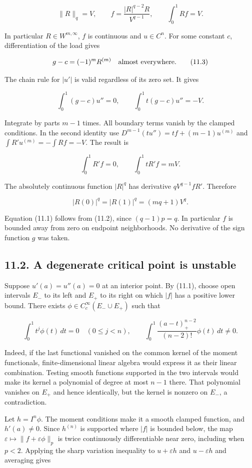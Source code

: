 \documentclass[11pt]{article}
\begin{document}
\[
\|R\|_q=V,\qquad f=\frac{|R|^{q-2}R}{V^{q-1}},\qquad
\int_0^1Rf=V.
\tag{11.2}
\]

In particular \(R\in W^{m,\infty}\), \(f\) is continuous and
\(u\in C^n\). For some constant \(c\), differentiation of the load gives

\[
g-c=(-1)^mR^{(m)}\quad\hbox{almost everywhere}.
\tag{11.3}
\]

The chain rule for \(|u'|\) is valid regardless of its zero set. It
gives

\[
\int_0^1(g-c)u''=0,\qquad
\int_0^1t(g-c)u''=-V.
\]

Integrate by parts \(m-1\) times. All boundary terms vanish by the
clamped conditions. In the second identity use
\(D^{m-1}(tu'')=tf+(m-1)u^{(m)}\) and \(\int R'u^{(m)}=-\int Rf=-V\).
The result is

\[
\int_0^1R'f=0,\qquad \int_0^1tR'f=mV.
\tag{11.4}
\]

The absolutely continuous function \(|R|^q\) has derivative
\(qV^{q-1}fR'\). Therefore

\[
|R(0)|^q=|R(1)|^q=(mq+1)V^q.
\tag{11.5}
\]

Equation (11.1) follows from (11.2), since \((q-1)p=q\). In particular
\(f\) is bounded away from zero on endpoint neighborhoods. No derivative
of the sign function \(g\) was taken.

\subsection{11.2. A degenerate critical point is
unstable}\label{a-degenerate-critical-point-is-unstable}

Suppose \(u'(a)=u''(a)=0\) at an interior point. By (11.1), choose open
intervals \(E_-\) to its left and \(E_+\) to its right on which \(|f|\)
has a positive lower bound. There exists
\(\phi\in C_c^\infty(E_-\cup E_+)\) such that

\[
\int_0^1t^j\phi(t)\,dt=0\quad(0\le j<n),\qquad
\int_0^1\frac{(a-t)_+^{n-2}}{(n-2)!}\phi(t)\,dt\ne0.
\tag{11.6}
\]

Indeed, if the last functional vanished on the common kernel of the
moment functionals, finite-dimensional linear algebra would express it
as their linear combination. Testing smooth functions supported in the
two intervals would make its kernel a polynomial of degree at most
\(n-1\) there. That polynomial vanishes on \(E_+\) and hence
identically, but the kernel is nonzero on \(E_-\), a contradiction.

Let \(h=I^n\phi\). The moment conditions make it a smooth clamped
function, and \(h'(a)\ne0\). Since \(h^{(n)}\) is supported where
\(|f|\) is bounded below, the map
\(\varepsilon\mapsto\|f+\varepsilon\phi\|_p\) is twice continuously
differentiable near zero, including when \(p<2\). Applying the sharp
variation inequality to \(u+\varepsilon h\) and \(u-\varepsilon h\) and
averaging gives
\end{document}
